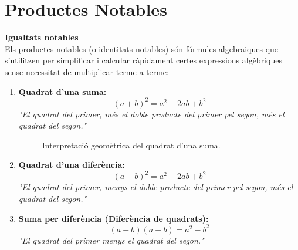 \documentclass[12pt]{article}
\begin{document}
\newpage

\section{Productes Notables}

\begin{concept}
\textbf{Igualtats notables}\\
Els productes notables (o identitats notables) són fórmules algebraiques que s'utilitzen per simplificar i calcular ràpidament certes expressions algèbriques sense necessitat de multiplicar terme a terme:

\begin{enumerate}
    \item \textbf{Quadrat d'una suma:}
    \[ (a + b)^2 = a^2 + 2ab + b^2 \]
    \textit{"El quadrat del primer, més el doble producte del primer pel segon, més el quadrat del segon."}

    \begin{figure}[H]
\centering
{}
\caption{Interpretació geomètrica del quadrat d'una suma.}
\end{figure}

    \item \textbf{Quadrat d'una diferència:}
    \[ (a - b)^2 = a^2 - 2ab + b^2 \]
    \textit{"El quadrat del primer, menys el doble producte del primer pel segon, més el quadrat del segon."}

    \item \textbf{Suma per diferència (Diferència de quadrats):}
    \[ (a + b)(a - b) = a^2 - b^2 \]
    \textit{"El quadrat del primer menys el quadrat del segon."}
\end{enumerate}



\end{concept}
\end{document}
